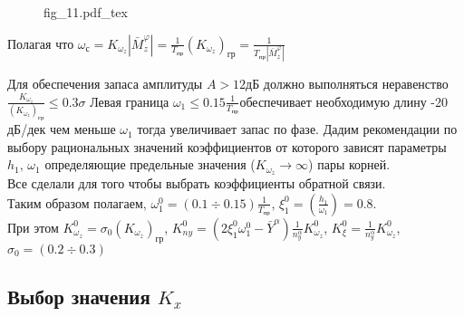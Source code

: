 \documentclass{article}
\begin{document}
\begin{figure}[H]
	\centering
	{fig_11.pdf_tex}
\end{figure}


Полагая что $\omega_\text{с} = K_{\omega_z} | \bar{M}_z^\varphi| =
	\frac{1}{T_\text{пр}}
	(K_{\omega_z})_\text{гр} = \frac{1}{T_\text{пр}|\bar{M}_z^\varphi|}$

Для обеспечения запаса амплитуды $A > 12 \text{дБ}$ должно выполняться
неравенство $\frac{K_{\omega_z}}{(K_{\omega_z})_\text{гр}} \leq 0.3 \sigma $
Левая граница $\omega_1 \leq 0.15 \frac{1}{T_\text{пр}}$обеспечивает
необходимую длину -20 дБ/дек чем меньше $\omega_1$ тогда увеличивает запас по
фазе.
Дадим рекомендации по выбору рациональных значений коэффициентов от которого
зависят параметры $h_1, \, \omega_1$ определяющие предельные значения
($K_{\omega_z} \rightarrow\infty$) пары корней.\\
Все сделали для того чтобы выбрать коэффициенты обратной связи. \\
Таким образом полагаем, $\omega_1^0 = (0.1 \div 0.15) \frac{1}{T_\text{пр}}$,
$\xi_1^0 = (\frac{h_1}{\omega_1}) = 0.8$.\\
При этом $K_{\omega_z}^0 = \sigma_0 (K_{\omega_z})_\text{гр}$, $K_{ny}^0 =
	(2\xi_1^0 \omega_1^0 - \bar{Y}^\alpha) \frac{1}{n_y^\alpha} K_{\omega_z}^0$,
$K_{\xi}^0 = \frac{1}{n_y^\alpha} K_{\omega_z}^0$, $\sigma_0 = (0.2 \div 0.3)$

\subsection{Выбор значения \texorpdfstring{$K_x$}{Lg}}
\end{document}
